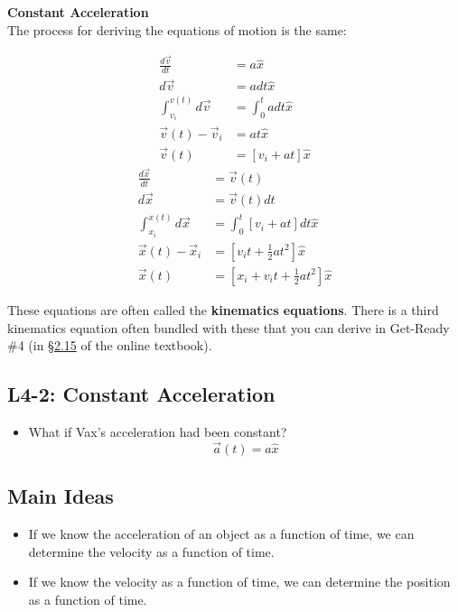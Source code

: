 \documentclass[]{article}
\begin{document}
\begin{TeacherMargin}
\noindent\textbf{Constant Acceleration} \\
The process for deriving the equations of motion is the same:
\begin{multicols}{2}
	\noindent
	\[
	\begin{split}
		\frac{d\vec{v}}{dt} & = a\hat{x} \\
		d\vec{v} & = adt\hat{x} \\
		\int_{v_{i}}^{v(t)}d\vec{v} & = \int_{0}^{t}adt\hat{x} \\
		\vec{v}(t) - \vec{v}_{i} & = at\hat{x} \\
		\vec{v}(t) & = \left[v_{i}+at\right]\hat{x}
	\end{split}
	\]
	\[
	\begin{split}
		\frac{d\vec{x}}{dt} & = \vec{v}(t) \\
		d\vec{x} & = \vec{v}(t)dt \\
		\int_{x_{i}}^{x(t)}d\vec{x} & = \int_{0}^{t}\left[v_{i}+at\right]dt\hat{x} \\
		\vec{x}(t) - \vec{x}_{i} & = \left[v_{i}t+\frac{1}{2}at^{2}\right]\hat{x} \\
		\vec{x}(t) & = \left[x_{i} + v_{i}t+\frac{1}{2}at^{2}\right]\hat{x}
	\end{split}
	\]
\end{multicols}
These equations are often called the \textbf{kinematics equations}. There is a third kinematics equation often bundled with these that you can derive in Get-Ready \#4 (in \href{https://lipa.physics.oregonstate.edu/sec_kinematics-1d.html}{\color{blue}\S2.15} of the online textbook).
\end{TeacherMargin}
\begin{PresentSpace}
\vspace{-10pt}
\section*{L4-2: Constant Acceleration}
\vspace{-10pt}
\begin{itemize}
	\item What if Vax's acceleration had been constant?
	\[
	\vec{a}(t) = a\hat{x}
	\]
\end{itemize}
\end{PresentSpace}
\newpage
\begin{TeacherMargin}

\end{TeacherMargin}
\begin{PresentSpace}
\section*{Main Ideas}
\begin{itemize}
	\item If we know the acceleration of an object as a function of time, we can determine the velocity as a function of time.
	\item If we know the velocity as a function of time, we can determine the position as a function of time.
\end{itemize}
\end{PresentSpace}
\end{document}
